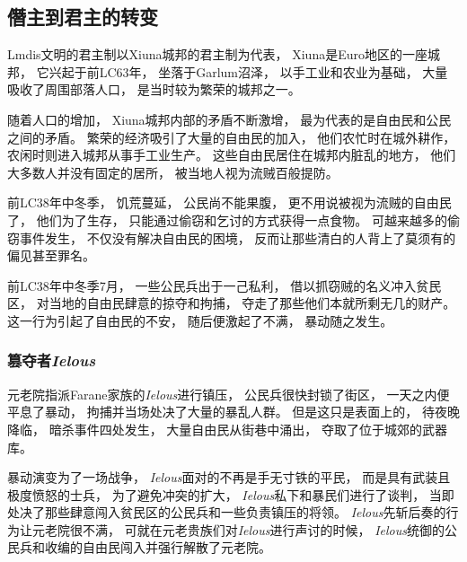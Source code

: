 \documentclass[UTF8,12pt]{ctexbook}
\begin{document}
            \subsection{僭主到君主的转变}
                Lmdis文明的君主制以Xiuna城邦的君主制为代表，
                Xiuna是Euro地区的一座城邦，
                它兴起于前LC63年，
                坐落于Garlum沼泽，
                以手工业和农业为基础，
                大量吸收了周围部落人口，
                是当时较为繁荣的城邦之一。

                随着人口的增加，
                Xiuna城邦内部的矛盾不断激增，
                最为代表的是自由民和公民之间的矛盾。
                繁荣的经济吸引了大量的自由民的加入，
                他们农忙时在城外耕作，
                农闲时则进入城邦从事手工业生产。
                这些自由民居住在城邦内脏乱的地方，
                他们大多数人并没有固定的居所，
                被当地人视为流贼百般提防。

                前LC38年中冬季，
                饥荒蔓延，
                公民尚不能果腹，
                更不用说被视为流贼的自由民了，
                他们为了生存，
                只能通过偷窃和乞讨的方式获得一点食物。
                可越来越多的偷窃事件发生，
                不仅没有解决自由民的困境，
                反而让那些清白的人背上了莫须有的偏见甚至罪名。

                前LC38年中冬季7月，
                一些公民兵出于一己私利，
                借以抓窃贼的名义冲入贫民区，
                对当地的自由民肆意的掠夺和拘捕，
                夺走了那些他们本就所剩无几的财产。
                这一行为引起了自由民的不安，
                随后便激起了不满，
                暴动随之发生。
                \subsubsection{篡夺者\emph{Ielous}}
                元老院指派Farane家族的\emph{Ielous}进行镇压，
                公民兵很快封锁了街区，
                一天之内便平息了暴动，
                拘捕并当场处决了大量的暴乱人群。
                但是这只是表面上的，
                待夜晚降临，
                暗杀事件四处发生，
                大量自由民从街巷中涌出，
                夺取了位于城郊的武器库。

                暴动演变为了一场战争，
                \emph{Ielous}面对的不再是手无寸铁的平民，
                而是具有武装且极度愤怒的士兵，
                为了避免冲突的扩大，
                \emph{Ielous}私下和暴民们进行了谈判，
                当即处决了那些肆意闯入贫民区的公民兵和一些负责镇压的将领。
                \emph{Ielous}先斩后奏的行为让元老院很不满，
                可就在元老贵族们对\emph{Ielous}进行声讨的时候，
                \emph{Ielous}统御的公民兵和收编的自由民闯入并强行解散了元老院。
                
\end{document}
